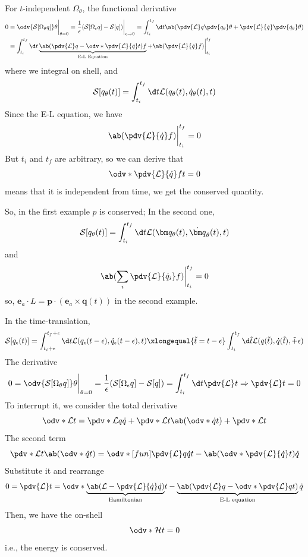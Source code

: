 For $t$-independent $\Omega_\theta$, the functional derivative
\begin{align*}
  0 & = \odv{\mathcal S[\Omega_\theta q]}\theta \bigg|_{\theta=0}
    = \frac1\epsilon (\mathcal S[\Omega_\epsilon q] - \mathcal S[q])
      \bigg|_{\epsilon \to 0}
    = \int_{t_i}^{t_f} \d t
      \ab(\pdv{\mathcal L}q \pdv{q_\theta}\theta
    + \pdv{\mathcal L}{\dot q} \pdv{\dot q_\theta}\theta) \\
    & = \int_{t_i}^{t_f} \d t
        \underbrace{\ab(\pdv{\mathcal L}q - \odv*{\pdv{\mathcal L}{\dot q}}t) f}
        _\text{E-L Equation}
      + \ab(\pdv{\mathcal L}{\dot q}f)\bigg|_{t_i}^{t_f}
\end{align*}
where we integral on shell, and
\[
  \mathcal S[q_\theta(t)] = \int_{t_i}^{t_f} \d t
  \mathcal L(q_\theta(t), \dot q_\theta(t), t)
\]
Since the E-L equation, we have
\[
  \ab(\pdv{\mathcal L}{\dot q}f)\bigg|_{t_i}^{t_f} = 0
\]
But $t_i$ and $t_f$ are arbitrary, so we can derive that
\[
  \odv*{\pdv{\mathcal L}{\dot q}f}t = 0
\]
means that it is independent from time, we get the conserved quantity.

So, in the first example $p$ is conserved; In the second one,
\[
  \mathcal S[q_\theta(t)] = \int_{t_i}^{t_f} \d t
  \mathcal L(\bm q_\theta(t), \dot{\bm q}_\theta(t), t)
\]
and
\[
  \ab(\sum_i \pdv{\mathcal L}{\dot q_i}f)\bigg|_{t_i}^{t_f} = 0
\]
so, $\bm e_a \cdot L = \bm p \cdot(\bm e_a \times \bm q(t))$
in the second example.

In the time-translation,
\[
  \mathcal S[q_\epsilon(t)] = \int_{t_i+\epsilon}^{t_f+\epsilon} \d t
  \mathcal L(q_\epsilon(t-\epsilon), \dot q_\epsilon(t-\epsilon), t)
\xlongequal{\tilde t = t - \epsilon} \int_{t_i}^{t_f} \d \tilde t
  \mathcal L(q(\tilde t), \dot q(\tilde t), \tilde + \epsilon)
\]
The derivative
\[
  0 = \odv{\mathcal S[\Omega_\theta q]}\theta \bigg|_{\theta=0}
    = \frac1\epsilon(\mathcal S[\Omega_\epsilon q] - \mathcal S[q])
    = \int_{t_i}^{t_f} \d t \pdv{\mathcal L}t \Rightarrow \pdv{\mathcal L}t = 0
\]
To interrupt it, we consider the total derivative
\[
  \odv*{\mathcal L}t = \pdv*{\mathcal L}q \dot q
+ \pdv*{\mathcal L}t\ab(\odv*{\dot q}t) + \pdv*{\mathcal L}t
\]
The second term
\[
  \pdv*{\mathcal L}t\ab(\odv*{\dot q}t)
= \odv*[fun]{\pdv{\mathcal L}q \dot q}t
- \ab(\odv*{\pdv{\mathcal L}{\dot q}}t)\dot q
\]
Substitute it and rearrange
\[
  0 = \pdv{\mathcal L}t = \odv*{\underbrace{\ab(
    \mathcal L - \pdv{\mathcal L}{\dot q} \dot q)}_\text{Hamiltonian}}t
- \underbrace{\ab(\pdv{\mathcal L}q - \odv*{\pdv{\mathcal L}q}t)}_
  \text{E-L equation} \dot q
\]
Then, we have the on-shell
\[
  \odv*{\mathcal H}t = 0
\]
i.e., the energy is conserved.

